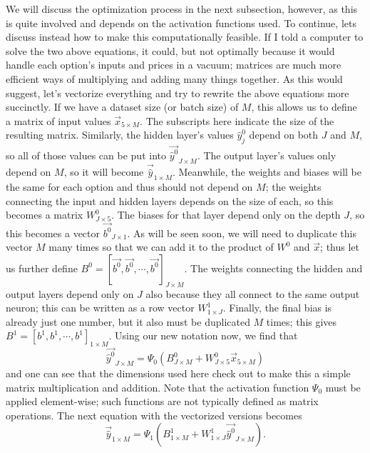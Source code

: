 \documentclass[reqno,14pt]{amsart}
\theoremstyle{plain}
\theoremstyle{definition}
\theoremstyle{remark}
\begin{document}
We will discuss the optimization process in the next subsection, however, as this is quite involved and depends on the activation functions used. To continue, lets discuss instead how to make this computationally feasible. If I told a computer to solve the two above equations, it could, but not optimally because it would handle each option's inputs and prices in a vacuum; matrices are much more efficient ways of multiplying and adding many things together. As this would suggest, let's vectorize everything and try to rewrite the above equations more succinctly. If we have a dataset size (or batch size) of $M$, this allows us to define a matrix of input values $\overrightarrow{x}_{5 \times M}$. The subscripts here indicate the size of the resulting matrix. Similarly, the hidden layer's values $\hat{y}^0_j$ depend on both $J$ and $M$, so all of those values can be put into $\overrightarrow{\hat{y}^0} _{J \times M}$. The output layer's values only depend on $M$, so it will become $\overrightarrow{\hat{y}}_{1 \times M}$. Meanwhile, the weights and biases will be the same for each option and thus should not depend on $M$; the weights connecting the input and hidden layers depends on the size of each, so this becomes a matrix $W^0_{J \times 5}$. The biases for that layer depend only on the depth $J$, so this becomes a vector $\overrightarrow{b^0}_{J \times 1}$. As will be seen soon, we will need to duplicate this vector $M$ many times so that we can add it to the product of $W^0$ and $\overrightarrow{x}$; thus let us further define $B^0 = [\overrightarrow{b^0}, \overrightarrow{b^0}, \cdots , \overrightarrow{b^0}]_{J \times M}$. The weights connecting the hidden and output layers depend only on $J$ also because they all connect to the same output neuron; this can be written as a row vector $W^1_{1 \times J}$. Finally, the final bias is already just one number, but it also must be duplicated $M$ times; this gives $B^1 = [b^1, b^1, \cdots , b^1]_{1 \times M}$. Using our new notation now, we find that
\begin{equation}
    \overrightarrow{\hat{y}^0}_{J \times M} = \Psi_0( B^0_{J \times M} + W^0_{J \times 5} \overrightarrow{x}_{5 \times M} )
\end{equation}
and one can see that the dimensions used here check out to make this a simple matrix multiplication and addition. Note that the activation function $\Psi_0$ must be applied element-wise; such functions are not typically defined as matrix operations. The next equation with the vectorized versions becomes
\begin{equation}
    \overrightarrow{\hat{y}}_{1 \times M} = \Psi_1( B^1_{1 \times M} + W^1_{1 \times J} \overrightarrow{\hat{y}^0}_{J \times M} ).
\end{equation}
\end{document}
